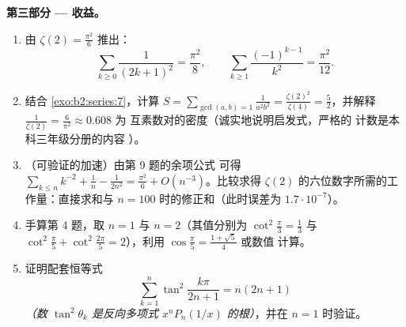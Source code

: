 \begin{problem}[{周末问题 --- $\zeta(2) = \pi^2/6$ 与
伯特兰全景}]
\medskip
\noindent\textbf{第三部分 --- 收益。}
\begin{enumerate}[resume]
  \item 由 $\zeta(2) = \frac{\pi^2}6$ 推出：
        \[
        \sum_{k\geq0}\frac{1}{(2k+1)^2} = \frac{\pi^2}{8},
        \qquad
        \sum_{k\geq1}\frac{(-1)^{k-1}}{k^2} = \frac{\pi^2}{12}.
        \]
  \item 结合 \cref{exo:b2:series:7}，计算 $S =
        \sum_{\gcd(a,b)=1}\frac{1}{a^2b^2} =
        \frac{\zeta(2)^2}{\zeta(4)} = \frac52$，并解释
        $\frac{1}{\zeta(2)} = \frac{6}{\pi^2} \approx 0.608$ 为
        互素数对的密度（诚实地说明启发式，严格的
        计数是本科三年级分册的内容
        ）。
  \item （可验证的加速）由第 9 题的余项公式
        可得 $\sum_{k\leq n}k^{-2} + \frac1n - \frac1{2n^2} =
        \frac{\pi^2}6 + O(n^{-3})$。比较求得
        $\zeta(2)$ 的六位数字所需的工作量：直接求和与
        $n = 100$ 时的修正和（此时误差为
        $1.7\cdot10^{-7}$）。
  \item 手算第 4 题，取 $n = 1$ 与 $n = 2$（其值分别为
        $\cot^2\frac\pi3 = \frac13$ 与
        $\cot^2\frac\pi5 + \cot^2\frac{2\pi}5 = 2$），利用
        $\cos\frac\pi5 = \frac{1+\sqrt5}4$ 或数值
        计算。
  \item 证明配套恒等式
        \[
        \sum_{k=1}^{n}\tan^2\frac{k\pi}{2n+1} = n(2n+1)
        \]
        \emph{（数 $\tan^2\theta_k$ 是反向多项式
        $x^nP_n(1/x)$ 的根）}，并在 $n
        = 1$ 时验证。
\end{enumerate}


\end{problem}
